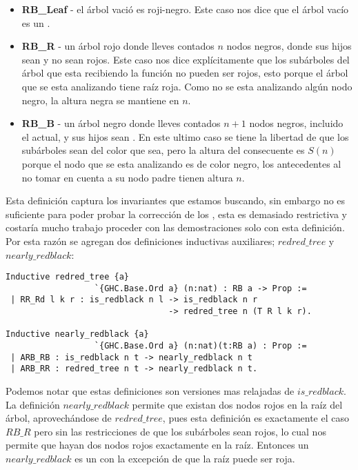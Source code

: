 \begin{itemize}
        \item \textbf{RB\_Leaf} - el árbol vació es roji-negro. Este caso nos dice que el \'arbol
        vacío es un {\arn}.
        \item \textbf{RB\_R} - un árbol rojo donde lleves contados $n$ nodos negros, donde sus
        hijos sean{\arns} y no sean rojos. Este caso nos dice explícitamente que los subárboles
        del árbol que esta recibiendo la función no pueden ser rojos, esto porque el árbol que se
        esta analizando tiene raíz roja. Como no se esta analizando algún nodo negro, la altura
        negra se mantiene en $n$.
        \item \textbf{RB\_B} - un árbol negro donde lleves contados $n+1$ nodos negros, incluido
        el actual, y sus hijos sean {\arns}. En este ultimo caso se tiene la libertad de que los
        subárboles sean del color que sea, pero la altura del consecuente es $S(n)$ porque el nodo
        que se esta analizando es de color negro, los antecedentes al no tomar en cuenta a su nodo
        padre tienen altura $n$.
\end{itemize}

Esta definici\'on captura los invariantes que estamos buscando, sin embargo no es suficiente para
poder probar la correcci\'on de los {\arns}, esta es demasiado restrictiva y costaría mucho
trabajo proceder con las demostraciones solo con esta definici\'on. Por esta razón se agregan dos
definiciones inductivas auxiliares; $redred\_tree$ y $nearly\_redblack$:

\begin{verbatim}
Inductive redred_tree {a}
                  `{GHC.Base.Ord a} (n:nat) : RB a -> Prop :=
 | RR_Rd l k r : is_redblack n l -> is_redblack n r
                                 -> redred_tree n (T R l k r).

Inductive nearly_redblack {a}
                  `{GHC.Base.Ord a} (n:nat)(t:RB a) : Prop :=
 | ARB_RB : is_redblack n t -> nearly_redblack n t
 | ARB_RR : redred_tree n t -> nearly_redblack n t.
\end{verbatim}

Podemos notar que estas definiciones son versiones mas relajadas de $is\_redblack$. La
definici\'on $nearly\_redblack$ permite que existan dos nodos rojos en la ra\'iz del \'arbol,
aprovech\'andose de $redred\_tree$, pues esta definici\'on es exactamente el caso $RB\_R$ pero sin
las restricciones de que los sub\'arboles sean rojos, lo cual nos permite que hayan dos nodos
rojos exactamente en la ra\'iz. Entonces un $nearly\_redblack$ es un {\arn} con la excepci\'on de
que la ra\'iz puede ser roja.

